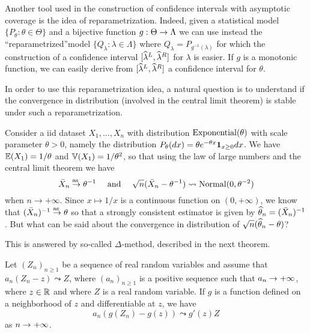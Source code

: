 Another tool used in the construction of confidence intervals with asymptotic coverage is the idea of reparametrization.
Indeed, given a statistical model $\{ P_\theta : \theta \in \Theta \}$ and a bijective function $g : \Theta \rightarrow \Lambda$ we can use instead the ``reparametrized''model $\{ Q_\lambda : \lambda \in \Lambda \}$ where $Q_\lambda = P_{g^{-1}(\lambda)}$ for which the construction of a confidence interval $[\widehat \lambda^L, \widehat \lambda^R]$ for $\lambda$ is easier.
If $g$ is a monotonic function, we can easily derive from $[\widehat \lambda^L, \widehat \lambda^R]$ a confidence interval for $\theta$.

In order to use this reparametrization idea, a natural question is to understand if the convergence in distribution (involved in the central limit theorem) is stable under such a reparametrization.
\begin{example}
	\label{ex:expo}
	Consider a iid dataset $X_1, \ldots, X_n$ with distribution $\operatorname{Exponential}(\theta)$ with scale parameter $\theta > 0$, namely the distribution $P_\theta(dx) = \theta e^{-\theta x} \mathbf 1_{x \geq 0} dx$. 
	We have $\mathbb E(X_1) = 1 / \theta$ and $\mathbb V(X_1) = 1 / \theta^2$, so that using the law of large numbers and the central limit theorem we have
	\begin{equation*}
		\bar X_n \overset{\text{as\ }}{\rightarrow} \theta^{-1} \quad \text{ and } \quad \sqrt n (\bar X_n - \theta^{-1}) \leadsto \operatorname{Normal}(0, \theta^{-2})
	\end{equation*}
	when $n \rightarrow +\infty$.
	Since $x \mapsto 1 / x$ is a continuous function on $(0, +\infty)$, we know that $(\bar X_n)^{-1} \overset{\text{as\ }}{\rightarrow} \theta$ so that a strongly consistent estimator is given by $\widehat \theta_n = (\bar X_n)^{-1}$.
	But what can be said about the convergence in distribution of $\sqrt n (\widehat \theta_n - \theta)$?
\end{example}
This is answered by so-called $\Delta$-method, described in the next theorem.
\begin{theorem}
	\label{thm:delta-method}
 	Let $(Z_n)_{n \geq 1}$ be a sequence of real random variables and assume that 
	$a_n(Z_n - z) \leadsto Z$, where $(a_n)_{n \geq 1}$ is a positive sequence such that $a_n \rightarrow +\infty$, where $z \in \mathbb R$ and where $Z$ is a real random variable.
 	If $g$ is a function defined on a neighborhood of $z$ and differentiable at $z$, we have 
 	\begin{equation}
 		a_n (g(Z_n) - g(z)) \leadsto g'(z) Z
 	\end{equation}
 	as $n \rightarrow +\infty$.
\end{theorem}
